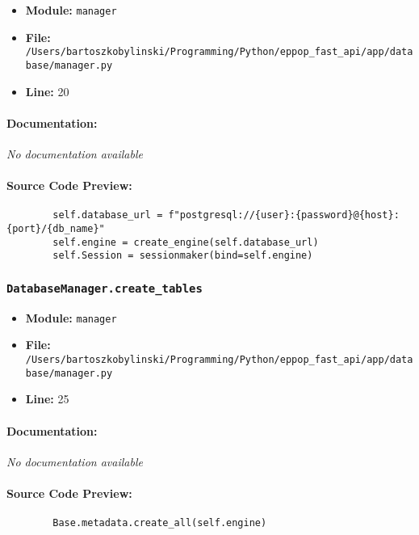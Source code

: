 \documentclass[11pt,a4paper]{article}
\begin{document}
\begin{itemize}
    \item \textbf{Module:} \texttt{manager}
    \item \textbf{File:} \texttt{/Users/bartoszkobylinski/Programming/Python/eppop\_fast\_api/app/database/manager.py}
    \item \textbf{Line:} 20
\end{itemize}

\paragraph{Documentation:} \textit{No documentation available}

\paragraph{Source Code Preview:}
\begin{verbatim}
        self.database_url = f"postgresql://{user}:{password}@{host}:{port}/{db_name}"
        self.engine = create_engine(self.database_url)
        self.Session = sessionmaker(bind=self.engine)
\end{verbatim}

\vspace{1em}
\subsubsection{\texttt{DatabaseManager.create\_tables}}

\begin{itemize}
    \item \textbf{Module:} \texttt{manager}
    \item \textbf{File:} \texttt{/Users/bartoszkobylinski/Programming/Python/eppop\_fast\_api/app/database/manager.py}
    \item \textbf{Line:} 25
\end{itemize}

\paragraph{Documentation:} \textit{No documentation available}

\paragraph{Source Code Preview:}
\begin{verbatim}
        Base.metadata.create_all(self.engine)
\end{verbatim}
\end{document}
